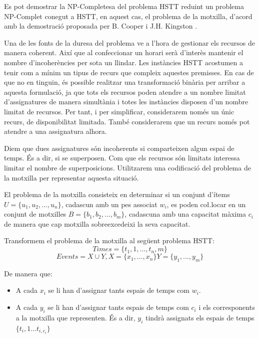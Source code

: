 \documentclass[11pt,a4paper,twoside]{report}
\begin{document}
    Es pot demostrar la NP-Completesa del problema HSTT reduint un problema NP-Complet conegut a HSTT, en aquest cas, el problema de la motxilla\cite{wiki:bin}, d'acord amb la demostració proposada per B. Cooper i J.H. Kingston \cite{complexityHSTT}.

    Una de les fonts de la duresa del problema ve a l'hora de gestionar els recursos de manera coherent. Així que al confeccionar un horari serà d'interès mantenir el nombre d'incoherències per sota un llindar. 
    Les instàncies HSTT acostumen a tenir com a mínim un tipus de recurs que compleix aquestes premisses. 
    En cas de que no en tinguin, és possible realitzar una transformació binària per arribar a aquesta formulació, 
    ja que tots els recursos poden atendre a un nombre limitat d'assignatures de manera simultània i totes les instàncies disposen d'un nombre limitat de recursos. Per tant, i per simplificar, considerarem només un únic recurs, de disponibilitat limitada. També considerarem que un recurs només pot atendre a una assignatura alhora.

    Diem que dues assignatures són incoherents si comparteixen algun espai de temps. És a dir, si se superposen. Com que els recursos són limitats interessa limitar el nombre de superposicions. Utilitzarem una codificació del problema de la motxilla per representar aquesta situació.

    El problema de la motxilla consisteix en determinar si un conjunt d'ítems $U = \{u_1, u_2, ..., u_n\}$, cadascun amb un pes associat $w_i$, es poden co\l.locar en un conjunt de motxilles $B = \{b_1, b_2, ..., b_m\}$, 
    cadascuna amb una capacitat màxima $c_i$ de manera que cap motxilla sobreexcedeixi la seva capacitat.

    Transformem el problema de la motxilla al següent problema HSTT: 
    \[
        Times = \{t_1,1, ..., t_n,m\}
    \]\[
        Events = X \cup Y, X = \{x_1, ..., x_n\} Y = \{y_1, ..., y_m\}
    \]

    De manera que: 
    \begin{itemize}
      \item A cada $x_i$ se li han d'assignar tants espais de temps com $w_i$.
      \item A cada $y_i$ se li han d'assignar tants espais de temps com $c_i$ i els corresponents a la motxilla que representen. És a dir, $y_i$ tindrà assignats els espais de temps $\{t_i,1 ... t_{i,c_i}\}$
    \end{itemize}
    
\end{document}
